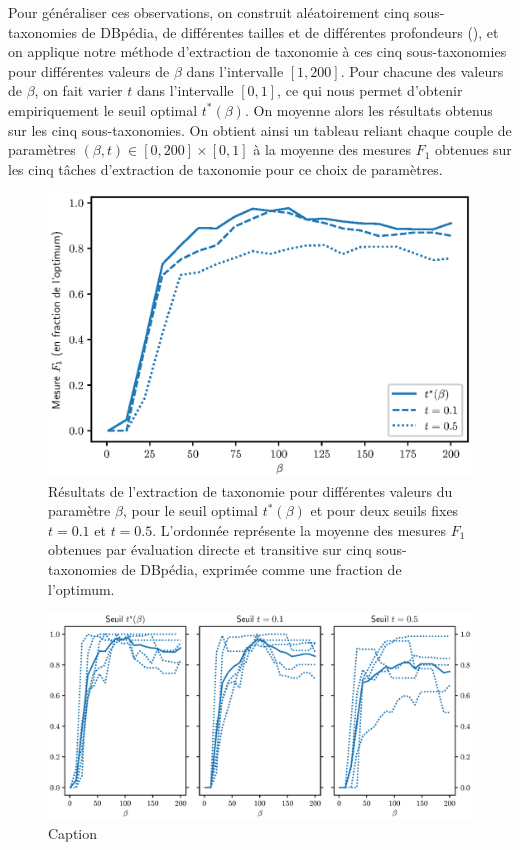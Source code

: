 Pour généraliser ces observations, on construit aléatoirement cinq sous-taxonomies de DBpédia, de différentes tailles et de différentes profondeurs (), et on applique notre méthode d'extraction de taxonomie à ces cinq sous-taxonomies pour différentes valeurs de $\beta$ dans l'intervalle $[1, 200]$. Pour chacune des valeurs de $\beta$, on fait varier $t$ dans l'intervalle $[0, 1]$, ce qui nous permet d'obtenir empiriquement le seuil optimal $t^*(\beta)$. On moyenne alors les résultats obtenus sur les cinq sous-taxonomies. On obtient ainsi un tableau reliant chaque couple de paramètres $(\beta, t) \in [0, 200] \times [0, 1]$ à la moyenne des mesures $F_1$ obtenues sur les cinq tâches d'extraction de taxonomie pour ce choix de paramètres.

\begin{figure}[h]
    \centering
    \includegraphics{fig/plot/average_beta_vs_best_all_FR.eps}
    \caption[Influence du paramètre $\beta$]{Résultats de l'extraction de taxonomie pour différentes valeurs du paramètre $\beta$, pour le seuil optimal $t^*(\beta)$ et pour deux seuils fixes $t=0.1$ et $t=0.5$. L'ordonnée représente la moyenne des mesures $F_1$ obtenues par évaluation directe et transitive sur cinq sous-taxonomies de DBpédia, exprimée comme une fraction de l'optimum.}
    \label{fig:beta-search-1}
\end{figure}

\begin{figure}
    \centering
    \includegraphics[width=\textwidth]{fig/plot/average_beta_breakdown_all3_FR.eps}
    \caption{Caption}
    \label{fig:beta-search-3}
\end{figure}

